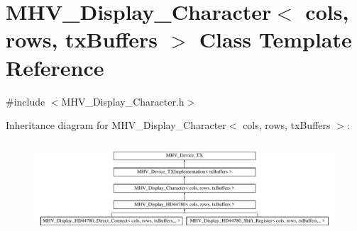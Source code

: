 \hypertarget{class_m_h_v___display___character}{\section{M\-H\-V\-\_\-\-Display\-\_\-\-Character$<$ cols, rows, tx\-Buffers $>$ Class Template Reference}
\label{class_m_h_v___display___character}
}


{\ttfamily \#include $<$M\-H\-V\-\_\-\-Display\-\_\-\-Character.\-h$>$}

Inheritance diagram for M\-H\-V\-\_\-\-Display\-\_\-\-Character$<$ cols, rows, tx\-Buffers $>$\-:\begin{figure}[H]
\begin{center}
\leavevmode
\includegraphics[height=3.439803cm]{class_m_h_v___display___character}
\end{center}
\end{figure}
